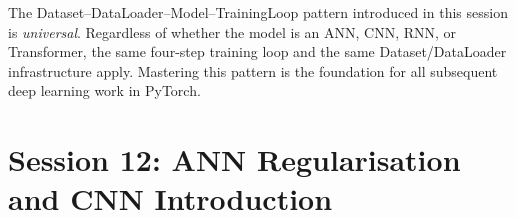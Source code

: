 \documentclass[12pt,a4paper]{article}
\begin{document}
\begin{keyinsight}[title=Core Takeaway]
The Dataset--DataLoader--Model--TrainingLoop pattern introduced in this
session is \emph{universal}.  Regardless of whether the model is an ANN, CNN,
RNN, or Transformer, the same four-step training loop and the same
Dataset/DataLoader infrastructure apply.  Mastering this pattern is the
foundation for all subsequent deep learning work in PyTorch.
\end{keyinsight}

\clearpage

\part{Session 12: ANN Regularisation and CNN Introduction}

\end{document}
